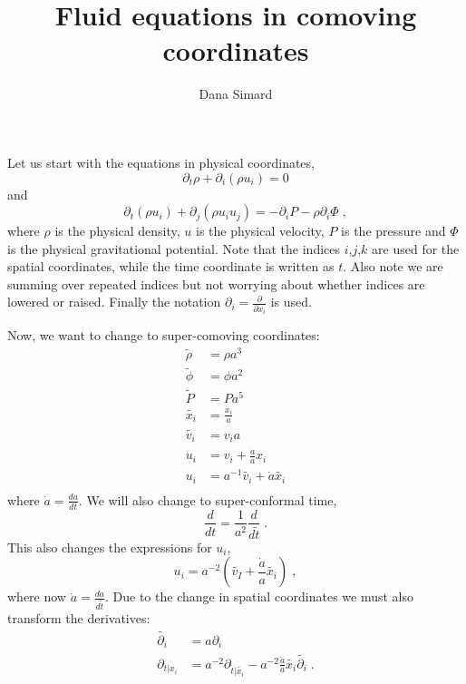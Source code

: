 \documentclass{article}
\newcommand{ \wt }{\widetilde}
\begin{document}
\title{Fluid equations in comoving coordinates}
\author{Dana Simard}

\maketitle


Let us start with the equations in physical coordinates,
\begin{equation}\label{eqn:physcontinuity}
  \partial_t \rho + \partial_i (\rho u_i)  = 0 
\end{equation}
and 
\begin{equation}\label{eqn:physeuler}
   \partial_t (\rho u_i) +  \partial_j (\rho u_i u_j) = - \partial_i P - \rho \partial_i \Phi \;,
\end{equation}
where $\rho$ is the physical density, $u$ is the physical velocity, $P$ is the pressure and $\Phi$ is the physical gravitational potential.  Note that the indices $i$,$j$,$k$ are used for the spatial coordinates, while the time coordinate is written as $t$.  Also note we are summing over repeated indices but not worrying about whether indices are lowered or raised.  Finally the notation $\partial_i = \frac{ \partial }{\partial x_i} $ is used. 

Now, we want to change to super-comoving coordinates:\\
\begin{align*}
 \wt{\rho} &= \rho a^3\\
\wt{\phi} &= \phi a^2  \\
\wt{P} &= P a^5 \\
\wt{x_i} & = \frac{x_i}{a}  \\
\wt{v_i} &= v_i a  \\
 u_i &= v_i + \frac{\dot{a}}{a} x_i  \\
u_i &= a^{-1}\wt{v_i} + \dot{a}\wt{x_i }  \\
\end{align*}
where $\dot{a} = \frac{da}{dt}$. 
We will also change to super-conformal time, 
\begin{equation} 
  \frac{d}{dt} = \frac{1}{a^2} \frac{d}{d\wt{t}}\;.
\end{equation} 
This also changes the expressions for $u_i$,
\begin{equation}
  u_i = a^{-2} (\wt{v_I} + \frac{\dot{a}}{a} \wt{x_i} )\;,
\end{equation}
where now $\dot{a} = \frac{da}{d\wt{t}}$.
Due to the change in spatial coordinates we must also transform the derivatives:
\begin{align*}
\wt{\partial_i } &= a \partial_i \\
\partial_{t |x_i} &= a^{-2}\partial_{\wt{t} | \wt{x_i}} - a^{-2}\frac{\dot{a}}{a} \wt{x_i} \wt{\partial_i} \;.
\end{align*}
\end{document}

